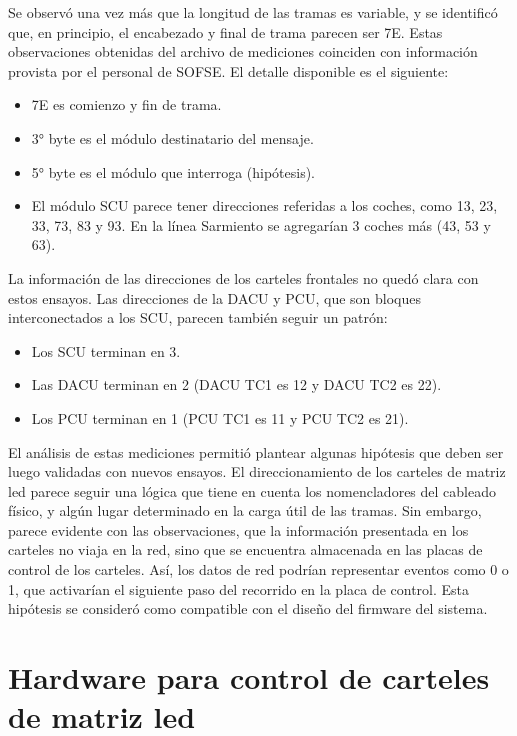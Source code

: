 Se observó una vez más que la longitud de las tramas es variable, y se identificó que, en principio, el encabezado y final de trama parecen ser 7E. Estas observaciones obtenidas del archivo de mediciones coinciden con información provista por el personal de SOFSE. El detalle disponible es el siguiente:

\begin{itemize}
\item 7E es comienzo y fin de trama.
\item  3° byte es el módulo destinatario del mensaje. 
\item  5° byte es el módulo que interroga (hipótesis).
\item  El módulo SCU parece tener direcciones referidas a los coches, como 13, 23, 33, 73, 83 y 93. En la línea Sarmiento se agregarían 3 coches más (43, 53 y 63).
\end{itemize}

La información de las direcciones de los carteles frontales no quedó clara con estos ensayos. Las direcciones de la DACU y PCU, que son bloques interconectados a los SCU, parecen también seguir un patrón:

\begin{itemize}
\item Los SCU terminan en 3.
\item Las DACU terminan en 2 (DACU TC1 es 12 y DACU TC2 es 22).
\item Los PCU terminan en 1 (PCU TC1 es 11 y PCU TC2 es 21).
\end{itemize}

El análisis de estas mediciones permitió plantear algunas hipótesis que deben ser luego validadas con nuevos ensayos. El direccionamiento de los carteles de matriz led parece seguir una lógica que tiene en cuenta los nomencladores del cableado físico, y algún lugar determinado en la carga útil de las tramas. Sin embargo, parece evidente con las observaciones, que la información presentada en los carteles no viaja en la red, sino que se encuentra almacenada en las placas de control de los carteles. Así, los datos de red podrían representar eventos como 0 o 1, que activarían el siguiente paso del recorrido en la placa de control. Esta hipótesis se consideró como compatible con el diseño del firmware del sistema.\\

\pagebreak
\section{Hardware para control de carteles de matriz led}

